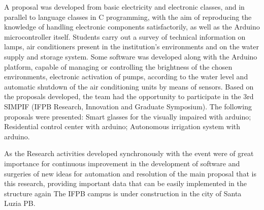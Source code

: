A proposal was developed from basic electricity and electronic classes, and in parallel to language classes in C programming, with the aim of reproducing the knowledge of handling electronic components satisfactorily, as well as the Arduino microcontroller itself. Students carry out a survey of technical information on lamps, air conditioners present in the institution's environments and on the water supply and storage system. Some software was developed along with the Arduino platform, capable of managing or controlling the brightness of the chosen environments, electronic activation of pumps, according to the water level and automatic shutdown of the air conditioning units by means of sensors. Based on the proposals developed, the team had the opportunity to participate in the 3rd SIMPIF (IFPB Research, Innovation and Graduate Symposium). The following proposals were presented: Smart glasses for the visually impaired with arduino; Residential control center with arduino; Autonomous irrigation system with arduino.\par
As the Research activities developed synchronously with the event were of great importance for continuous improvement in the development of software and surgeries of new ideas for automation and resolution of the main proposal that is this research, providing important data that can be easily implemented in the structure again The IFPB campus is under construction in the city of Santa Luzia PB.

